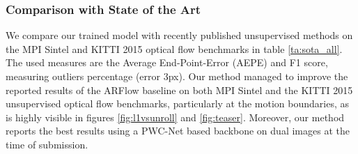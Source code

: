 \documentclass[10pt,twocolumn,letterpaper]{article}
\begin{document}
 
\subsubsection{Comparison with State of the Art}
We compare our trained model with recently published unsupervised methods on the MPI Sintel and KITTI 2015 optical flow benchmarks in table \ref{ta:sota_all}. The used measures are the Average End-Point-Error (AEPE) and F1 score, measuring outliers percentage (error  3px). 
Our method managed to improve the reported results of the ARFlow \cite{liu2020learning} baseline on both MPI Sintel and the KITTI 2015 unsupervised optical flow benchmarks, particularly at the motion boundaries, as is highly visible in figures \ref{fig:l1vsunroll} and \ref{fig:teaser}. Moreover, our method reports the best results using a PWC-Net based backbone on dual images at the time of submission.
\end{document}
